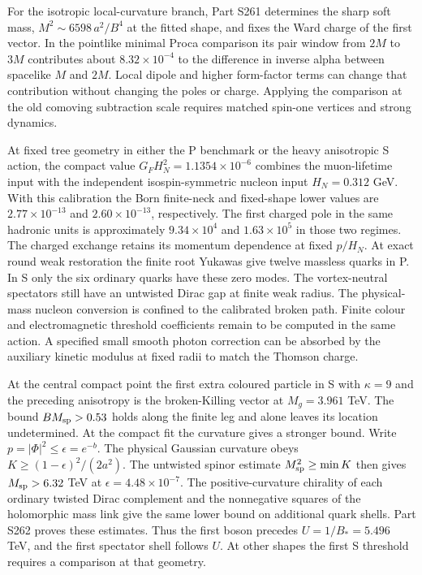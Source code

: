 \documentclass[aps,prd,reprint,onecolumn,nofootinbib,amsmath,amssymb]{revtex4-2}
\begin{document}
For the isotropic local-curvature branch, Part S261 determines the sharp soft mass, $M^2\sim6598\,a^2/B^4$ at the fitted shape, and fixes the Ward charge of the first vector. In the pointlike minimal Proca comparison its pair window from $2M$ to $3M$ contributes about $8.32\times10^{-4}$ to the difference in inverse alpha between spacelike $M$ and $2M$. Local dipole and higher form-factor terms can change that contribution without changing the poles or charge. Applying the comparison at the old comoving subtraction scale requires matched spin-one vertices and strong dynamics.

At fixed tree geometry in either the P benchmark or the heavy anisotropic S action, the compact value $G_F H_N^2=1.1354\times10^{-6}$ combines the muon-lifetime input with the independent isospin-symmetric nucleon input $H_N=0.312$ GeV. With this calibration the Born finite-neck and fixed-shape lower values are $2.77\times10^{-13}$ and $2.60\times10^{-13}$, respectively. The first charged pole in the same hadronic units is approximately $9.34\times10^4$ and $1.63\times10^5$ in those two regimes. The charged exchange retains its momentum dependence at fixed $p/H_N$. At exact round weak restoration the finite root Yukawas give twelve massless quarks in P. In S only the six ordinary quarks have these zero modes. The vortex-neutral spectators still have an untwisted Dirac gap at finite weak radius. The physical-mass nucleon conversion is confined to the calibrated broken path. Finite colour and electromagnetic threshold coefficients remain to be computed in the same action. A specified small smooth photon correction can be absorbed by the auxiliary kinetic modulus at fixed radii to match the Thomson charge.

At the central compact point the first extra coloured particle in S with $\kappa=9$ and the preceding anisotropy is the broken-Killing vector at $M_g=3.961$ TeV. The bound $BM_{\rm sp}>0.53$ holds along the finite leg and alone leaves its location undetermined. At the compact fit the curvature gives a stronger bound. Write $p=|\Phi|^2\le\epsilon=e^{-b}$. The physical Gaussian curvature obeys $K\ge(1-\epsilon)^2/(2a^2)$. The untwisted spinor estimate $M_{\rm sp}^2\ge\min K$ then gives $M_{\rm sp}>6.32$ TeV at $\epsilon=4.48\times10^{-7}$. The positive-curvature chirality of each ordinary twisted Dirac complement and the nonnegative squares of the holomorphic mass link give the same lower bound on additional quark shells. Part S262 proves these estimates. Thus the first boson precedes $U=1/B_*=5.496$ TeV, and the first spectator shell follows $U$. At other shapes the first S threshold requires a comparison at that geometry.
\end{document}
